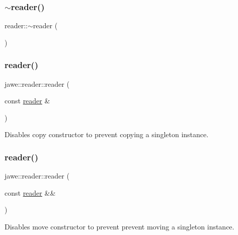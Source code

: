 \subsubsection{\texorpdfstring{$\sim$reader()}{~reader()}}
{\footnotesize\ttfamily reader\+::$\sim$reader (\begin{DoxyParamCaption}{ }\end{DoxyParamCaption})}

\mbox{\label{classjawe_1_1reader_a0a500fafc39cbd1ec6fdc4e91059ac53}} 
\subsubsection{\texorpdfstring{reader()}{reader()}\hspace{0.1cm}{\footnotesize\ttfamily [1/3]}}
{\footnotesize\ttfamily jawe\+::reader\+::reader (\begin{DoxyParamCaption}\item[{const \hyperlink{classjawe_1_1reader}{reader} \&}]{ }\end{DoxyParamCaption})\hspace{0.3cm}{\ttfamily [delete]}}

Disables copy constructor to prevent copying a singleton instance. \mbox{\label{classjawe_1_1reader_a8ca44a9f065253817097a060e2dc5b61}} 
\subsubsection{\texorpdfstring{reader()}{reader()}\hspace{0.1cm}{\footnotesize\ttfamily [2/3]}}
{\footnotesize\ttfamily jawe\+::reader\+::reader (\begin{DoxyParamCaption}\item[{const \hyperlink{classjawe_1_1reader}{reader} \&\&}]{ }\end{DoxyParamCaption})\hspace{0.3cm}{\ttfamily [delete]}}

Disables move constructor to prevent prevent moving a singleton instance. \mbox{\label{classjawe_1_1reader_a26cb352853e28ca605e4adae1be3932d}} 
